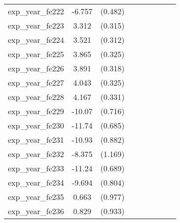 {\begin{tabular}{l*{4}{cc}}
exp\_year\_fe222&   -6.757\sym{***}&  (0.482)&                  &         &                  &         &                  &         \\
exp\_year\_fe223&    3.312\sym{***}&  (0.315)&                  &         &                  &         &                  &         \\
exp\_year\_fe224&    3.521\sym{***}&  (0.312)&                  &         &                  &         &                  &         \\
exp\_year\_fe225&    3.865\sym{***}&  (0.325)&                  &         &                  &         &                  &         \\
exp\_year\_fe226&    3.891\sym{***}&  (0.318)&                  &         &                  &         &                  &         \\
exp\_year\_fe227&    4.043\sym{***}&  (0.325)&                  &         &                  &         &                  &         \\
exp\_year\_fe228&    4.167\sym{***}&  (0.331)&                  &         &                  &         &                  &         \\
exp\_year\_fe229&   -10.07\sym{***}&  (0.716)&                  &         &                  &         &                  &         \\
exp\_year\_fe230&   -11.74\sym{***}&  (0.685)&                  &         &                  &         &                  &         \\
exp\_year\_fe231&   -10.93\sym{***}&  (0.882)&                  &         &                  &         &                  &         \\
exp\_year\_fe232&   -8.375\sym{***}&  (1.169)&                  &         &                  &         &                  &         \\
exp\_year\_fe233&   -11.24\sym{***}&  (0.689)&                  &         &                  &         &                  &         \\
exp\_year\_fe234&   -9.694\sym{***}&  (0.804)&                  &         &                  &         &                  &         \\
exp\_year\_fe235&    0.663         &  (0.977)&                  &         &                  &         &                  &         \\
exp\_year\_fe236&    0.829         &  (0.933)&                  &         &                  &         &                  &         \\

\end{tabular}}
